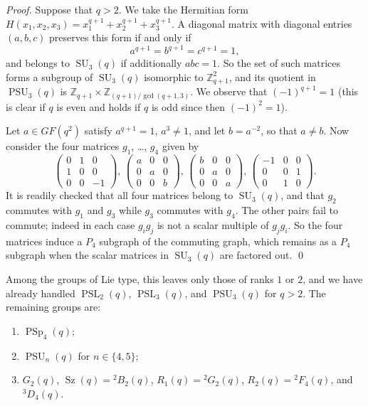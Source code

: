 \documentclass{elsarticle}
\newcommand{\PSL}{\mathop{\mathrm{PSL}}\nolimits}
\newcommand{\Sz}{\mathop{\mathrm{Sz}}\nolimits}
\newcommand{\PSU}{\mathop{\mathrm{PSU}}\nolimits}
\newcommand{\SU}{\mathop{\mathrm{SU}}\nolimits}
\newcommand{\PSp}{\mathop{\mathrm{PSp}}\nolimits}
\begin{document}
\begin{proof}
Suppose that $q>2$.
We take the Hermitian form $H(x_1,x_2,x_3)=x_1^{q+1}+x_2^{q+1}+x_3^{q+1}$.
A diagonal matrix with diagonal entries $(a,b,c)$ preserves this form if and
only if
\[a^{q+1}=b^{q+1}=c^{q+1}=1,\]
and belongs to $\SU_3(q)$ if additionally $abc=1$.
So the set of such matrices forms a subgroup of $\SU_3(q)$ isomorphic to
$\mathbb{Z}_{q+1}^2$, and its quotient in $\PSU_3(q)$ is
$\mathbb{Z}_{q+1}\times \mathbb{Z}_{(q+1)/\gcd(q+1,3)}$. We observe that $(-1)^{q+1}=1$ (this
is clear if $q$ is even and holds if $q$ is odd since then $(-1)^2=1$).

Let $a\in GF(q^2)$ satisfy $a^{q+1}=1$, $a^3\ne1$, and let $b=a^{-2}$, so
that $a\ne b$. Now consider the four matrices $g_1$, \dots, $g_4$ given by
\[
\left(\begin{array}{ccc}0&1&0\\1&0&0\\0&0&-1\end{array}\right),\,
\left(\begin{array}{ccc}a&0&0\\0&a&0\\0&0&b\end{array}\right),\,
\left(\begin{array}{ccc}b&0&0\\0&a&0\\0&0&a\end{array}\right),\,
\left(\begin{array}{ccc}-1&0&0\\0&0&1\\0&1&0\end{array}\right).
\]
It is readily checked that all four matrices belong to $\SU_3(q)$, and that
$g_2$ commutes with $g_1$ and $g_3$ while $g_3$ commutes with $g_4$. The
other pairs fail to commute; indeed in each case $g_ig_j$ is not a scalar
multiple of $g_jg_i$. So the four matrices induce a $P_4$ subgraph of the
commuting graph, which remains as a $P_4$ subgraph when the scalar matrices
in $\SU_3(q)$ are factored out. \qed
\end{proof}


\medskip

Among the groups of Lie type, this leaves only those of ranks $1$ or $2$,
and we have already handled $\PSL_2(q)$, $\PSL_3(q)$, and $\PSU_3(q)$ for $q>2$. The remaining groups
are:
\begin{enumerate}\itemsep0pt
\item $\PSp_4(q)$;
\item $\PSU_n(q)$ for $n\in\{4,5\}$;
\item $G_2(q)$, $\Sz(q)={}^2B_2(q)$, $R_1(q)={}^2G_2(q)$, $R_2(q)={}^2F_4(q)$, and
${}^3D_4(q)$.
\end{enumerate}
\end{document}
